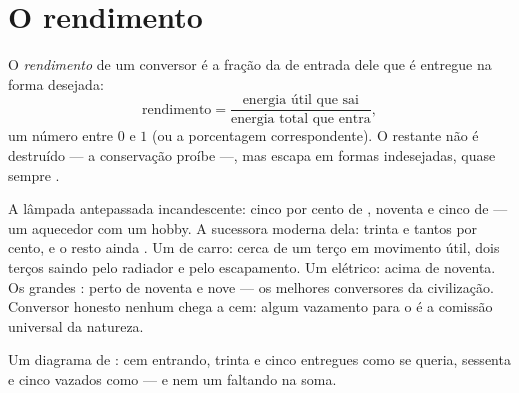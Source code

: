 \section{O rendimento}

\begin{definition}[Rendimento]\label{def:g9:energy-conversions:efficiency}
O \emph{rendimento} de um conversor é a fração da
 de entrada dele que é entregue na forma desejada:
\[
\text{rendimento} =
\frac{\text{energia útil que sai}}{\text{energia total que entra}},
\]
um número entre $0$ e $1$ (ou a porcentagem correspondente). O
restante não é destruído --- a conservação proíbe ---, mas escapa em
formas indesejadas, quase sempre .
\end{definition}

\begin{example}[Boletins]\label{ex:g9:energy-conversions:reportcards}
A lâmpada antepassada incandescente: cinco por cento de , noventa
e cinco de  --- um aquecedor com um hobby. A sucessora moderna
dela: trinta e tantos por cento, e o resto ainda . Um  de
carro: cerca de um terço em movimento útil, dois terços saindo pelo
radiador e pelo escapamento. Um  elétrico: acima de noventa. Os
grandes : perto de noventa e nove --- os melhores
conversores da civilização. Conversor honesto nenhum chega a cem:
algum vazamento para o  é a comissão universal da natureza.
\end{example}

\begin{omfigure}

{\small Um diagrama de : cem  entrando, trinta e
cinco entregues como se queria, sessenta e cinco vazados como 
--- e nem um  faltando na soma.}
\end{omfigure}

